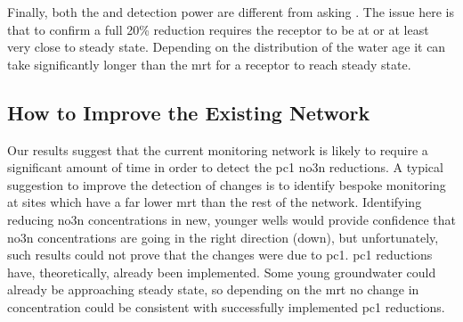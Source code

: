 Finally, both the  and  detection power are different from asking . The issue here is that to confirm a full 20\% reduction requires the receptor to be at or at least very close to steady state. Depending on the distribution of the water age it can take significantly longer than the \gls{mrt} for a receptor to reach steady state.

\subsection[Possible Network Improvements]{How to Improve the Existing Network}

Our results suggest that the current monitoring network is likely to require a significant amount of time in order to detect the \gls{pc1} \gls{no3n} reductions. A typical suggestion to improve the detection of changes is to identify bespoke monitoring at sites which have a far lower \gls{mrt} than the rest of the network. Identifying reducing \gls{no3n} concentrations in new, younger wells would provide confidence that \gls{no3n} concentrations are going in the right direction (down), but unfortunately, such results could not prove that the changes were due to \gls{pc1}. \gls{pc1} reductions have, theoretically, already been implemented. Some young groundwater could already be approaching steady state, so depending on the \gls{mrt} no change in concentration could be consistent with successfully implemented \gls{pc1} reductions.

